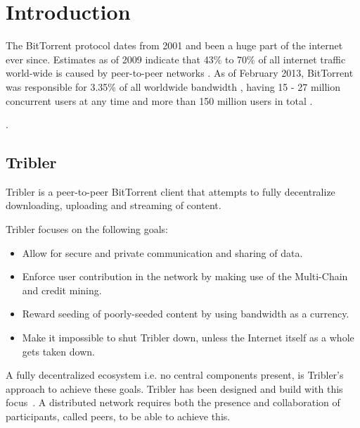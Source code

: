 \chapter{Introduction}
\label{chp:introduction}

The BitTorrent protocol dates from 2001 \cite{Cohen2001BitTorrent} and been a huge part of the internet ever since.
Estimates as of 2009 indicate that 43\% to 70\% of all internet traffic world-wide is caused by peer-to-peer networks \cite{schulze2009internet}.
As of February 2013, BitTorrent was responsible for 3.35\% of all worldwide bandwidth \cite{palo2013application}, having 15 - 27 million concurrent users at any time \cite{wang2013measuring} and more than 150 million users in total \cite{reuters2012bittorrent}.



.

\section{Tribler}
Tribler is a peer-to-peer BitTorrent client that attempts to fully decentralize downloading, uploading and streaming of content.

Tribler focuses on the following goals:
\begin{itemize}
    \item Allow for secure and private communication and sharing of data.
    \item Enforce user contribution in the network by making use of the Multi-Chain and credit mining.
    \item Reward seeding of poorly-seeded content by using bandwidth as a currency.
    \item Make it impossible to shut Tribler down, unless the Internet itself as a whole gets taken down.
\end{itemize}

A fully decentralized ecosystem i.e. no central components present, is Tribler's approach to achieve these goals.
Tribler has been designed and build with this focus~\cite{Pouwelse-tribler,Bakker-tribler}.
A distributed network requires both the presence and collaboration of participants, called peers, to be able to achieve this.


